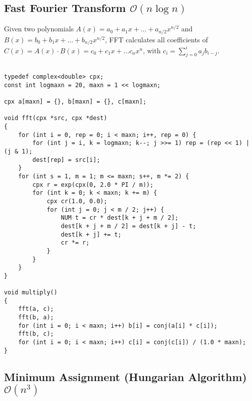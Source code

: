 \documentclass{article}
\begin{document}
\begin{comment}
\end{minipage}\hfill
\begin{minipage}{.45\textwidth}
	\begin{lstlisting}[title={Inclusive, Inclusive}]
bool test(int n);
	
int lo = 0, hi = n - 1;
// assert(test(lo) && !test(hi + 1));
while (lo < hi) {
	int mid = (lo + hi + 1) / 2;
	if (test(mid)) lo = mid;
	else hi = mid - 1;
}
return lo;
	\end{lstlisting}
\end{minipage}
\end{comment}

\subsection{Fast Fourier Transform $\mathcal{O}(n \log n)$}

Given two polynomials $A(x) = a_0 + a_1 x + \dots + a_{n/2} x^{n/2}$ and $B(x) = b_0 + b_1 x + \dots + b_{n/2} x^{n/2}$, FFT calculates all coefficients of $C(x) = A(x) \cdot B(x) = c_0 + c_1 x + \dots c_{n} x^{n}$, with $c_i = \sum_{j=0}^{i} a_j b_{i-j}$.

\begin{lstlisting}

typedef complex<double> cpx;
const int logmaxn = 20, maxn = 1 << logmaxn;

cpx a[maxn] = {}, b[maxn] = {}, c[maxn];

void fft(cpx *src, cpx *dest)
{
	for (int i = 0, rep = 0; i < maxn; i++, rep = 0) {
		for (int j = i, k = logmaxn; k--; j >>= 1) rep = (rep << 1) | (j & 1);
		dest[rep] = src[i];
	}
	for (int s = 1, m = 1; m <= maxn; s++, m *= 2) {
		cpx r = exp(cpx(0, 2.0 * PI / m));
		for (int k = 0; k < maxn; k += m) {
			cpx cr(1.0, 0.0);
			for (int j = 0; j < m / 2; j++) {
				NUM t = cr * dest[k + j + m / 2];
				dest[k + j + m / 2] = dest[k + j] - t;
				dest[k + j] += t;
				cr *= r;
			}
		}
	}
}

void multiply()
{
	fft(a, c);
	fft(b, a);
	for (int i = 0; i < maxn; i++) b[i] = conj(a[i] * c[i]);
	fft(b, c);
	for (int i = 0; i < maxn; i++) c[i] = conj(c[i]) / (1.0 * maxn);
}
\end{lstlisting}

\subsection{Minimum Assignment (Hungarian Algorithm) $\mathcal{O}(n^{3})$}
\end{document}

